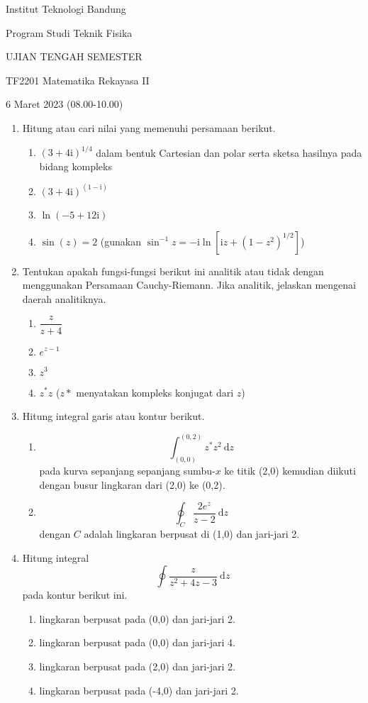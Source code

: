 \documentclass[11pt,english]{article}
\renewcommand{\imath}{\mathrm{i}}
\begin{document}
{\centering
Institut Teknologi Bandung

Program Studi Teknik Fisika

{\LARGE UJIAN TENGAH SEMESTER}

TF2201 Matematika Rekayasa II

6 Maret 2023 (08.00-10.00)
\par}


\begin{enumerate}
%
\item Hitung atau cari nilai yang memenuhi persamaan berikut.
  \begin{enumerate}
  \item $(3+4\imath)^{1/4}$ dalam bentuk Cartesian dan polar serta sketsa
  hasilnya pada bidang kompleks
  \item $(3+4\imath)^{(1-\imath)}$
  \item $\ln(-5+12\imath)$
  \item $\sin(z)=2$ (gunakan $\sin^{-1}z=-\mathrm{i}\ln\left[\mathrm{i}z+\left(1-z^{2}\right)^{1/2}\right]$)
  \end{enumerate}
%
\item Tentukan apakah fungsi-fungsi berikut ini analitik atau tidak dengan
menggunakan Persamaan Cauchy-Riemann. Jika analitik, jelaskan mengenai
daerah analitiknya.
  \begin{enumerate}
  \item $\dfrac{z}{z+4}$
  \item $e^{z-1}$
  \item $z^{3}$
  \item $z^{*}z$ ($z*$ menyatakan kompleks konjugat dari $z$)
  \end{enumerate}
%
\item Hitung integral garis atau kontur berikut.
  \begin{enumerate}
  \item $$\int_{(0,0)}^{(0,2)}z^{*}z^{2}\ \mathrm{d}z$$
  pada kurva sepanjang
  sepanjang sumbu-$x$ ke titik (2,0) kemudian diikuti dengan busur
  lingkaran dari (2,0) ke (0,2).
  \item $$\oint_{C} \dfrac{2e^{z}}{z-2}\ \mathrm{d}z$$
  dengan $C$ adalah
  lingkaran berpusat di (1,0) dan jari-jari 2.
  \end{enumerate}
%
\item Hitung integral
\[
\oint\frac{z}{z^{2}+4z-3}\ \mathrm{d}z
\]
pada kontur berikut ini.
\begin{enumerate}
\item lingkaran berpusat pada (0,0) dan jari-jari 2.
\item lingkaran berpusat pada (0,0) dan jari-jari 4.
\item lingkaran berpusat pada (2,0) dan jari-jari 2.
\item lingkaran berpusat pada (-4,0) dan jari-jari 2.
\end{enumerate}
\end{enumerate}
\end{document}
